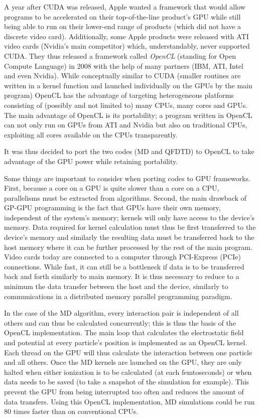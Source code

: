 A year after CUDA was released, Apple wanted a framework that would allow
programs to be accelerated on their top-of-the-line product's GPU while still
being able to run on their lower-end range of products (which did not have a
discrete video card). Additionally, some Apple products were released with ATI
video cards (Nvidia's main competitor) which, understandably, never supported
CUDA. They thus released a framework called \textit{OpenCL} (standing for
Open Compute Language) in 2008 with the help of many partners (IBM, ATI, Intel
and even Nvidia). While conceptually similar to CUDA (smaller routines are
written in a kernel function and launched individually on the GPUs by the main
program) OpenCL has the advantage of targeting heterogeneous platforms
consisting of (possibly and not limited to) many CPUs, many cores and GPUs. The
main advantage of OpenCL is its portability; a program written in OpenCL can
not only run on GPUs from ATI and Nvidia but also on traditional CPUs,
exploiting all cores available on the CPUs transparently.

It was thus decided to port the two codes (MD and QFDTD) to OpenCL to take
advantage of the GPU power while retaining portability.

Some things are important to consider when porting codes to GPU frameworks.
First, because a core on a GPU is quite slower than a core on a CPU,
parallelisms must be extracted from algorithms. Second, the main drawback of
GP-GPU programming is the fact that GPUs have their own memory, independent of
the system's memory; kernels will only have access to the device's memory. Data
required for kernel calculation must thus be first transferred to the device's
memory and similarly the resulting data must be transferred back to the host
memory where it can be further processed by the rest of the main program. Video
cards today are connected to a computer through PCI-Express (PCIe) connections.
While fast, it can still be a bottleneck if data is to be transferred back and
forth similarly to main memory. It is thus necessary to reduce to a minimum the
data transfer between the host and the device, similarly to communications in a
distributed memory parallel programming paradigm.

In the case of the MD algorithm, every interaction pair is independent of all
others and can thus be calculated concurrently; this is thus the basis of the
OpenCL implementation. The main loop that calculates the electrostatic field
and potential at every particle's position is implemented as an OpenCL kernel.
Each thread on the GPU will thus calculate the interaction between one particle
and all others. Once the MD kernels are launched on the GPU, they are only
halted when either ionization is to be calculated (at each femtoseconds) or
when data needs to be saved (to take a snapshot of the simulation for example).
This prevent the GPU from being interrupted too often and reduces the amount of
data transfers. Using this OpenCL implementation, MD simulations could be run
80 times faster than on conventional CPUs.


